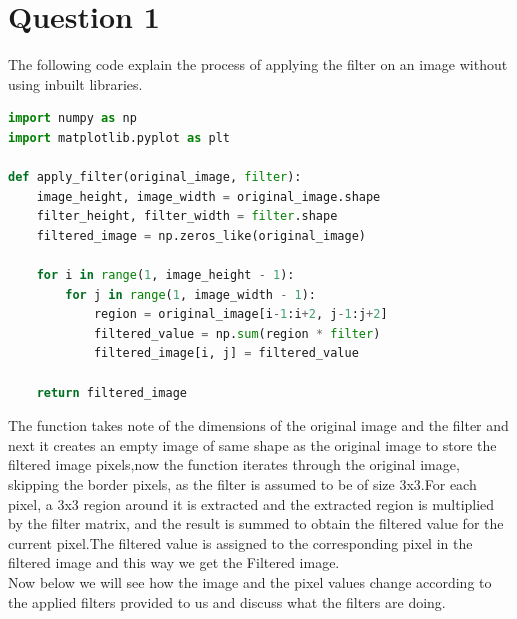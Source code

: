 \documentclass{assignment}
\begin{document}

\section*{Question 1}
The following code explain the process of applying the filter on an image without using inbuilt libraries.
\begin{lstlisting}[language=Python]
import numpy as np
import matplotlib.pyplot as plt

def apply_filter(original_image, filter):
    image_height, image_width = original_image.shape
    filter_height, filter_width = filter.shape
    filtered_image = np.zeros_like(original_image)
 
    for i in range(1, image_height - 1):
        for j in range(1, image_width - 1):
            region = original_image[i-1:i+2, j-1:j+2]
            filtered_value = np.sum(region * filter)
            filtered_image[i, j] = filtered_value

    return filtered_image
\end{lstlisting}
  The function takes note of the dimensions  of the original image and the filter and next it creates an empty image of same shape as the original image to store the filtered image pixels,now the function iterates through the original image, skipping the border pixels, as the filter is assumed to be of size 3x3.For each pixel, a 3x3 region around it is extracted and the extracted region is multiplied by the filter matrix, and the result is summed to obtain the filtered value for the current pixel.The filtered value is assigned to the corresponding pixel in the filtered image and this way we get the Filtered image.
\\
Now below we will see how the image and the pixel values change according to the applied filters provided to us and discuss what the filters are doing.
\\
\end{document}
